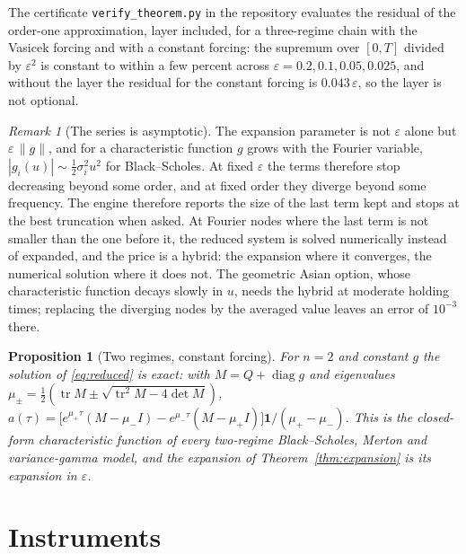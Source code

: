 \documentclass[11pt]{article}
\newtheorem{proposition}[theorem]{Proposition}
\theoremstyle{remark}
\newtheorem{remark}[theorem]{Remark}
\newcommand{\eps}{\varepsilon}
\newcommand{\diag}{\operatorname{diag}}
\begin{document}
The certificate
\texttt{verify\_theorem.py} in the repository evaluates the residual of the order-one approximation, layer included,
for a three-regime chain with the Vasicek forcing and with a constant forcing: the supremum over $[0,T]$ divided by
$\eps^2$ is constant to within a few percent across $\eps = 0.2, 0.1, 0.05, 0.025$, and without the layer the
residual for the constant forcing is $0.043\,\eps$, so the layer is not optional.

\begin{remark}[The series is asymptotic]
The expansion parameter is not $\eps$ alone but $\eps\,\|g\|$, and for a characteristic function $g$ grows with the
Fourier variable, $|g_i(u)| \sim \tfrac12\sigma_i^2 u^2$ for Black--Scholes. At fixed $\eps$ the terms therefore
stop decreasing beyond some order, and at fixed order they diverge beyond some frequency. The engine
therefore reports the size of the last term kept and stops at the best truncation when asked. At Fourier nodes
where the last term is not smaller than the one before it, the reduced system is solved numerically instead of
expanded, and the price is a hybrid: the expansion where it converges, the numerical solution where it does not.
The geometric Asian option, whose characteristic function decays slowly in $u$, needs the hybrid at moderate
holding times; replacing the diverging nodes by the averaged value leaves an error of $10^{-3}$ there.
\end{remark}

\begin{proposition}[Two regimes, constant forcing]
For $n = 2$ and constant $g$ the solution of \eqref{eq:reduced} is exact: with $M = Q + \diag g$ and
eigenvalues $\mu_\pm = \tfrac12(\operatorname{tr}M \pm \sqrt{\operatorname{tr}^2 M - 4\det M})$,
$a(\tau) = \big[e^{\mu_+\tau}(M - \mu_- I) - e^{\mu_-\tau}(M - \mu_+ I)\big]\mathbf 1/(\mu_+ - \mu_-)$.
This is the closed-form characteristic function of every two-regime Black--Scholes, Merton and variance-gamma
model, and the expansion of Theorem~\ref{thm:expansion} is its expansion in $\eps$.
\end{proposition}

\section{Instruments}
\label{sec:instruments}
\end{document}
